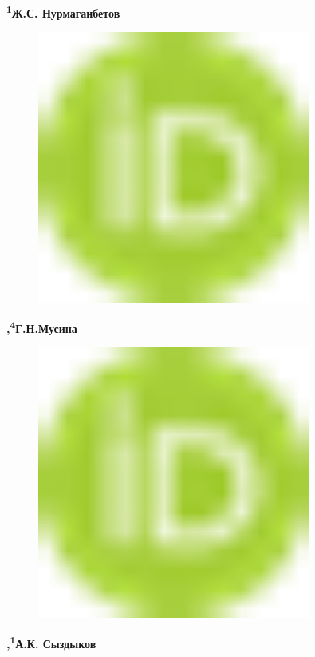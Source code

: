 {\bfseries \textsuperscript{1}Ж.С.
Нурмаганбетов}
\begin{figure}[H]
	\centering
	\includegraphics[width=0.8\textwidth]{media/chem2/image1}
	\caption*{}
\end{figure}
{\bfseries ,\textsuperscript{4}Г.Н.Мусина}
\begin{figure}[H]
	\centering
	\includegraphics[width=0.8\textwidth]{media/chem2/image1}
	\caption*{}
\end{figure}
{\bfseries ,\textsuperscript{1}А.К.
Сыздыков}
